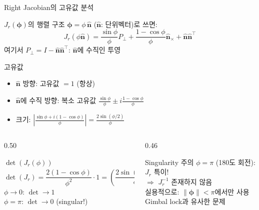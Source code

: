 \begin{frame}[shrink=20]{Right Jacobian의 고유값 분석}
  \begin{block}{$J_r(\bm{\phi})$의 행렬 구조}
    $\bm{\phi} = \phi\,\hat{\bm{n}}$ ($\hat{\bm{n}}$: 단위벡터)로 쓰면:
    \[
      J_r(\phi\hat{\bm{n}}) = \frac{\sin\phi}{\phi} P_\perp
      + \frac{1-\cos\phi}{\phi} \hat{\bm{n}}_\times
      + \hat{\bm{n}}\hat{\bm{n}}^\top
    \]
    여기서 $P_\perp = I - \hat{\bm{n}}\hat{\bm{n}}^\top$: $\hat{\bm{n}}$에 수직인 투영
  \end{block}
  \pause
  \begin{alertblock}{고유값}
    \begin{itemize}
      \item $\hat{\bm{n}}$ 방향: 고유값 $= 1$ (항상)
      \item $\hat{\bm{n}}$에 수직 방향: 복소 고유값 $\frac{\sin\phi}{\phi} \pm i\frac{1-\cos\phi}{\phi}$
      \item 크기: $\left|\frac{\sin\phi + i(1-\cos\phi)}{\phi}\right| = \frac{2\sin(\phi/2)}{\phi}$
    \end{itemize}
  \end{alertblock}
  \pause
  \begin{columns}[T]
    \begin{column}{0.50\textwidth}
      \begin{block}{$\det(J_r(\phi))$}
        \[
          \det(J_r) = \frac{2(1-\cos\phi)}{\phi^2} \cdot 1 = \left(\frac{2\sin(\phi/2)}{\phi}\right)^2
        \]
        $\phi \to 0$: $\det \to 1$\\
        $\phi = \pi$: $\det \to 0$ (singular!)
      \end{block}
    \end{column}
    \begin{column}{0.46\textwidth}
      \begin{exampleblock}{Singularity 주의}
        $\phi = \pi$ (180도 회전): $J_r$ 특이!\\
        $\Rightarrow$ $J_r^{-1}$ 존재하지 않음\\
        \medskip
        실용적으로: $\|\bm{\phi}\| < \pi$에서만 사용\\
        Gimbal lock과 유사한 문제
      \end{exampleblock}
    \end{column}
  \end{columns}
\end{frame}


